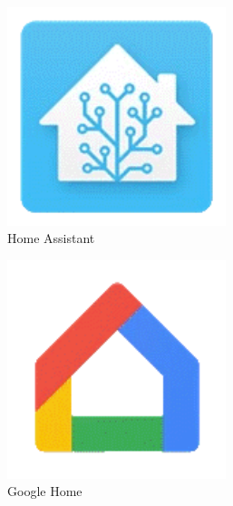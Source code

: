 \begin{figure}[h!tb]
 	\centering
 	\begin{subfigure}[b]{0.3\linewidth}
 		\centering
 		\includegraphics[width=0.7\textwidth]{img/home-assistant-io_logo.png}
 		\caption[Home Assistant Logo]{Home Assistant}
 		\label{fig:hassio-logo}
 	\end{subfigure}
 	\hfill
 	\begin{subfigure}[b]{0.3\linewidth}
 		\centering
 		\includegraphics[width=0.7\textwidth]{img/google-cast_logo.png}
 		\caption[Google Home Logo]{Google Home}
 		\label{fig:google-home-logo}
 	\end{subfigure}
 	\hfill
 	\begin{subfigure}[b]{0.3\linewidth}
 		\centering

\end{subfigure}
\end{figure}
